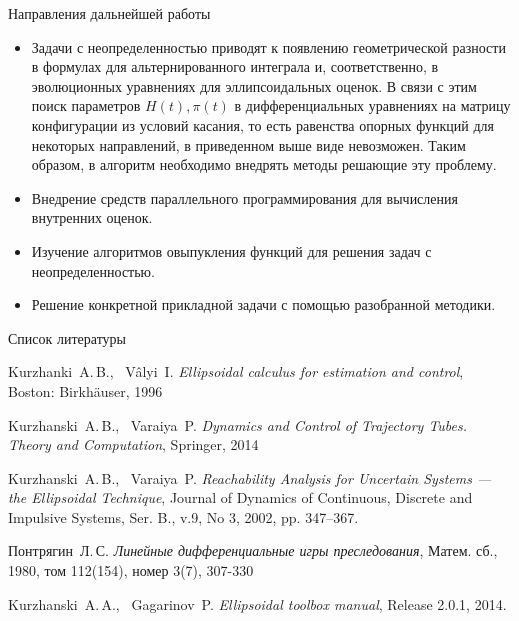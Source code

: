 \documentclass{beamer}
\begin{document}
\begin{frame}{Направления дальнейшей работы}
    \begin{itemize}
        \item Задачи с неопределенностью приводят к появлению геометрической разности в формулах для альтернированного интеграла и, соответственно, в эволюционных уравнениях для эллипсоидальных оценок. В связи с этим поиск параметров \( H(t), \pi(t) \) в дифференциальных уравнениях на матрицу конфигурации из условий касания, то есть равенства опорных функций для некоторых направлений, в приведенном выше виде невозможен. Таким образом, в алгоритм необходимо внедрять методы решающие эту проблему.
        \item Внедрение средств параллельного программирования для вычисления внутренних оценок.
        \item Изучение алгоритмов овыпукления функций для решения задач с неопределенностью.
        \item Решение конкретной прикладной задачи с помощью разобранной методики.
    \end{itemize}
\end{frame}

\begin{frame}{Список литературы}
    \small
    \begin{thebibliography}{0}
	
	 Kurzhanki~A.\,B., \ Vâlyi~I.
	\emph{Ellipsoidal calculus for estimation and control}, Boston: Birkhäuser, 1996
	
	Kurzhanski~A.\,B., \ Varaiya~P. \emph{Dynamics and Control of Trajectory Tubes. Theory and Computation}, Springer, 2014

	 Kurzhanski~A.\,B., \ Varaiya~P. 
	\emph{Reachability Analysis for Uncertain Systems — the Ellipsoidal Technique}, Journal of Dynamics of Continuous, Discrete and Impulsive Systems, Ser. B., v.9, No 3, 2002, pp. 347–367.
    
	 Понтрягин~Л.\,С.
	\emph{Линейные дифференциальные игры преследования}, Матем. сб., 1980, том 112(154), номер 3(7), 307-330
	
	 Kurzhanski~A.\,A., \ Gagarinov~P. 
	\emph{Ellipsoidal toolbox manual}, Release 2.0.1, 2014.
	
\end{thebibliography}
\end{frame}
\end{document}
